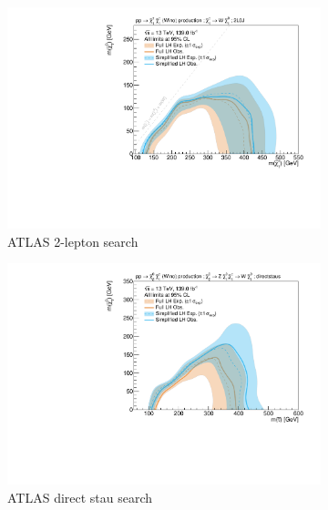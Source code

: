 \begin{figure}
\begin{subfigure}[b]{0.5\textwidth}
		\centering\includegraphics[width=\textwidth]{exclusion_2L0J_noLabel}
		\caption{ATLAS 2-lepton search~\cite{SUSY-2018-32}\label{fig:results_2L0J}}
	\end{subfigure}\hfill
	\begin{subfigure}[b]{0.5\textwidth}
		\centering\includegraphics[width=\textwidth]{exclusion_directstaus_noLabel}
		\caption{ATLAS direct stau search~\cite{SUSY-2018-04}\label{fig:results_directstaus}}
	\end{subfigure}\hfill
	\begin{subfigure}[b]{0.5\textwidth}

\end{subfigure}
\end{figure}
